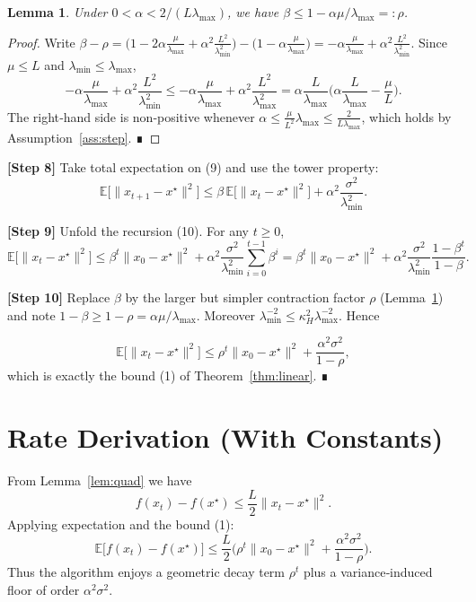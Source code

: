 \documentclass[11pt]{article}
\newtheorem{lemma}{Lemma}
\newcommand{\E}{\mathbb{E}}
\begin{document}
\begin{lemma}\label{lem:beta}
Under $0<\alpha<2/(L\lambda_{\max})$, we have $\beta\le 1-\alpha\mu/\lambda_{\max}=:\rho$.
\end{lemma}
\begin{proof}
Write $\beta-\rho = 
\big(1-2\alpha\frac{\mu}{\lambda_{\max}}+\alpha^{2}\frac{L^{2}}{\lambda_{\min}^{2}}\big)
-\big(1-\alpha\frac{\mu}{\lambda_{\max}}\big)
= -\alpha\frac{\mu}{\lambda_{\max}}+\alpha^{2}\frac{L^{2}}{\lambda_{\min}^{2}}$.
Since $\mu\le L$ and $\lambda_{\min}\le\lambda_{\max}$,
\[
-\alpha\frac{\mu}{\lambda_{\max}}+\alpha^{2}\frac{L^{2}}{\lambda_{\min}^{2}}
\le -\alpha\frac{\mu}{\lambda_{\max}}+\alpha^{2}\frac{L^{2}}{\lambda_{\max}^{2}}
= \alpha\frac{L}{\lambda_{\max}}\Big(\alpha\frac{L}{\lambda_{\max}}- \frac{\mu}{L}\Big).
\]
The right‑hand side is non‑positive whenever $\alpha\le \frac{\mu}{L^{2}}\lambda_{\max}\le \frac{2}{L\lambda_{\max}}$,
which holds by Assumption~\ref{ass:step}. ∎
\end{proof}

\noindent\textbf{[Step 8]} Take total expectation on (9) and use the tower property:
\[
\E\big[\|x_{t+1}-x^{\star}\|^{2}\big]
\le \beta\,\E\big[\|x_{t}-x^{\star}\|^{2}\big]
    +\alpha^{2}\frac{\sigma^{2}}{\lambda_{\min}^{2}}.
\tag{10}
\]

\noindent\textbf{[Step 9]} Unfold the recursion (10). For any $t\ge0$,
\[
\E\big[\|x_{t}-x^{\star}\|^{2}\big]
\le \beta^{t}\|x_{0}-x^{\star}\|^{2}
   +\alpha^{2}\frac{\sigma^{2}}{\lambda_{\min}^{2}}
     \sum_{i=0}^{t-1}\beta^{i}
= \beta^{t}\|x_{0}-x^{\star}\|^{2}
   +\alpha^{2}\frac{\sigma^{2}}{\lambda_{\min}^{2}}\frac{1-\beta^{t}}{1-\beta}.
\tag{11}
\]

\noindent\textbf{[Step 10]} Replace $\beta$ by the larger but simpler contraction factor $\rho$ (Lemma~\ref{lem:beta}) and note $1-\beta\ge 1-\rho = \alpha\mu/\lambda_{\max}$. Moreover $\lambda_{\min}^{-2}\le \kappa_{H}^{2}\lambda_{\max}^{-2}$. Hence

\[
\E\big[\|x_{t}-x^{\star}\|^{2}\big]
\le \rho^{t}\|x_{0}-x^{\star}\|^{2}
   +\frac{\alpha^{2}\sigma^{2}}{1-\rho},
\]
which is exactly the bound (1) of Theorem~\ref{thm:linear}. ∎

\section*{Rate Derivation (With Constants)}
From Lemma~\ref{lem:quad} we have
\[
f(x_{t})-f(x^{\star})\le \frac{L}{2}\|x_{t}-x^{\star}\|^{2}.
\]
Applying expectation and the bound (1):
\[
\E\big[f(x_{t})-f(x^{\star})\big]
\le \frac{L}{2}\Big(\rho^{t}\|x_{0}-x^{\star}\|^{2}
      +\frac{\alpha^{2}\sigma^{2}}{1-\rho}\Big).
\]
Thus the algorithm enjoys a geometric decay term $\rho^{t}$ plus a variance‑induced floor of order $\alpha^{2}\sigma^{2}$.
\end{document}
